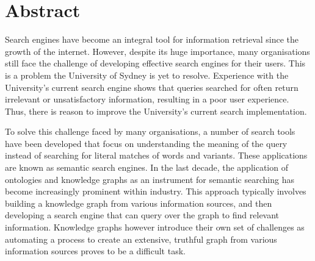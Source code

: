 

\chapter*{Abstract} Search engines have become an integral tool for information retrieval since the growth of the internet. However, despite its huge importance, many organisations still face the challenge of developing effective search engines for their users. This is a problem the University of Sydney is yet to resolve. Experience with the University’s current search engine shows that queries searched for often return irrelevant or unsatisfactory information, resulting in a poor user experience. Thus, there is reason to improve the University’s current search implementation.

To solve this challenge faced by many organisations, a number of search tools have been developed that focus on understanding the meaning of the query instead of searching for literal matches of words and variants. These applications are known as semantic search engines. In the last decade, the application of ontologies and knowledge graphs as an instrument for semantic searching has become increasingly prominent within industry. This approach typically involves building a knowledge graph from various information sources, and then developing a search engine that can query over the graph to find relevant information. Knowledge graphs however introduce their own set of challenges as automating a process to create an extensive, truthful graph from various information sources proves to be a difficult task.
